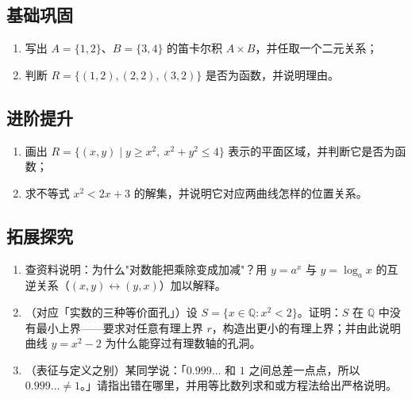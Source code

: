 \begin{afterclass}
\subsection*{基础巩固}
\begin{enumerate}
  \item 写出 $A=\{1,2\}$、$B=\{3,4\}$ 的笛卡尔积 $A\times B$，并任取一个二元关系；
  \item 判断 $R=\{(1,2),(2,2),(3,2)\}$ 是否为函数，并说明理由。
\end{enumerate}

\subsection*{进阶提升}
\begin{enumerate}
  \item 画出 $R=\{(x,y)\mid y\geq x^2,\ x^2+y^2\leq4\}$ 表示的平面区域，并判断它是否为函数；
  \item 求不等式 $x^2<2x+3$ 的解集，并说明它对应两曲线怎样的位置关系。
\end{enumerate}

\subsection*{拓展探究}
\begin{enumerate}
  \item 查资料说明：为什么"对数能把乘除变成加减"？用 $y=a^x$ 与 $y=\log_a x$ 的互逆关系（$(x,y)\leftrightarrow(y,x)$）加以解释。
  \item （对应「实数的三种等价面孔」）设 $S=\{x\in\mathbb{Q}:x^2<2\}$。证明：$S$ 在 $\mathbb{Q}$ 中没有最小上界——要求对任意有理上界 $r$，构造出更小的有理上界；并由此说明曲线 $y=x^2-2$ 为什么能穿过有理数轴的孔洞。
  \item （表征与定义之别）某同学说：「$0.999\dots$ 和 $1$ 之间总差一点点，所以 $0.999\dots\neq1$。」请指出错在哪里，并用等比数列求和或方程法给出严格说明。
\end{enumerate}


\end{afterclass}
